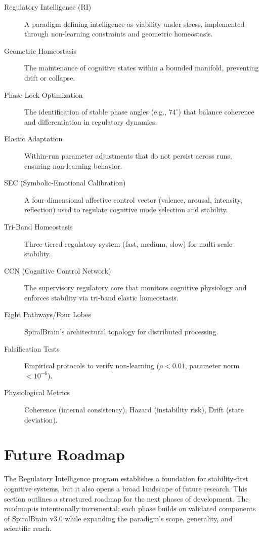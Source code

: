 \documentclass[12pt,a4paper]{report}
\begin{document}
\begin{description}
\item[Regulatory Intelligence (RI)] A paradigm defining intelligence as viability under stress, implemented through non-learning constraints and geometric homeostasis.

\item[Geometric Homeostasis] The maintenance of cognitive states within a bounded manifold, preventing drift or collapse.

\item[Phase-Lock Optimization] The identification of stable phase angles (e.g., $74^\circ$) that balance coherence and differentiation in regulatory dynamics.

\item[Elastic Adaptation] Within-run parameter adjustments that do not persist across runs, ensuring non-learning behavior.

\item[SEC (Symbolic-Emotional Calibration)] A four-dimensional affective control vector (valence, arousal, intensity, reflection) used to regulate cognitive mode selection and stability.

\item[Tri-Band Homeostasis] Three-tiered regulatory system (fast, medium, slow) for multi-scale stability.

\item[CCN (Cognitive Control Network)] The supervisory regulatory core that monitors cognitive physiology and enforces stability via tri-band elastic homeostasis.

\item[Eight Pathways/Four Lobes] SpiralBrain's architectural topology for distributed processing.

\item[Falsification Tests] Empirical protocols to verify non-learning (\(\rho < 0.01\), parameter norm \(< 10^{-6}\)).

\item[Physiological Metrics] Coherence (internal consistency), Hazard (instability risk), Drift (state deviation).
\end{description}

\section{Future Roadmap}

The Regulatory Intelligence program establishes a foundation for stability‑first cognitive systems, but it also opens a broad landscape of future research. This section outlines a structured roadmap for the next phases of development. The roadmap is intentionally incremental: each phase builds on validated components of SpiralBrain v3.0 while expanding the paradigm’s scope, generality, and scientific reach.
\end{document}
